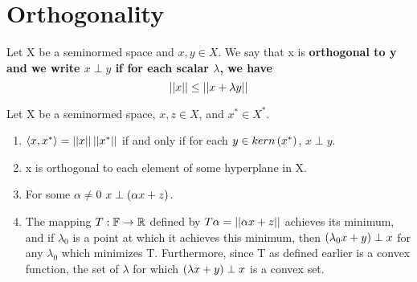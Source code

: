 
\section{Orthogonality}
\begin{df}[Orthogonality]
    \label{df:orthogonality}
    Let X be a seminormed space and $x,y \in X$. We say that x is \bf orthogonal \rm to y and we write $x \perp y$ if for each scalar $\lambda$, we have
    \begin{equation}
        \left|\left| x \right|\right| \leq \left|\left| x+\lambda y \right|\right| 
    \end{equation} 
\end{df}

\begin{prop}[Orthogonality]
    \label{prop:orthogonality}
    Let X be a seminormed space, $x,z \in  X$, and $x^* \in X^*$. 
    \begin{enumerate} 
        \item $\left\langle x,x^* \right\rangle = \left|\left| x \right|\right| \left|\left| x^* \right|\right|$ if and only if for each $y \in kern\left( x^*\right)$, $x \perp y$. 
        \item x is orthogonal to each element of some hyperplane in X. 
        \item For some $\alpha \neq 0$ $x \perp \left( \alpha x + z\right)$.
        \item The mapping $T:\mathbb{F} \to \mathbb{R}$ defined by $T\alpha = \left|\left| \alpha x+z \right|\right|$ achieves its minimum, and if $\lambda_0$ is a point at which it achieves this minimum, then $\left( \lambda_0 x + y\right) \perp x$ for any $\lambda_0$ which minimizes T. Furthermore, since T as defined earlier is a convex function, the set of $\lambda$ for which $\left( \lambda x+y\right) \perp x$ is a convex set. 
    \end{enumerate} 
\end{prop} 
